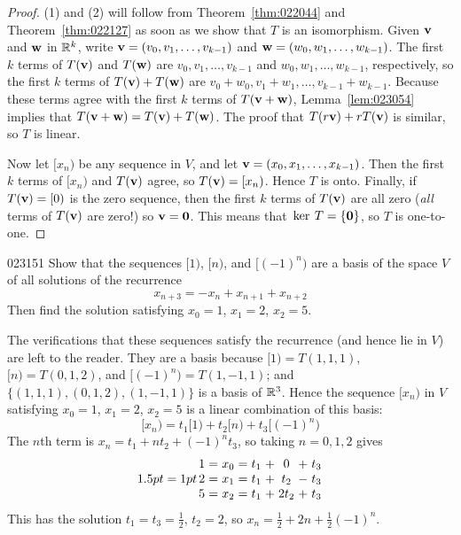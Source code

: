 \begin{proof}
(1) and (2) will follow from Theorem~\ref{thm:022044} and Theorem~\ref{thm:022127} as soon as we show that $T$ is an isomorphism. Given $\textbf{v}$ and $\textbf{w}$ in $\mathbb{R}^k$, write $\textbf{v} = (v_{0}, v_{1}, \dots, v_{k-1})$ and $\textbf{w} = (w_{0}, w_{1}, \dots, w_{k-1})$. The first $k$ terms of $T(\textbf{v})$ and $T(\textbf{w})$ are $v_{0}, v_{1}, \dots, v_{k-1}$ and $w_{0}, w_{1}, \dots, w_{k-1}$, respectively, so the first $k$ terms of $T(\textbf{v}) + T(\textbf{w})$ are $v_{0} + w_{0}, v_{1} + w_{1}, \dots, v_{k-1} + w_{k-1}$. Because these terms agree with the first $k$ terms of $T(\textbf{v} + \textbf{w})$, Lemma~\ref{lem:023054} implies that $T(\textbf{v} + \textbf{w}) = T(\textbf{v}) + T(\textbf{w})$. The proof that $T(r\textbf{v}) + rT(\textbf{v})$ is similar, so $T$ is linear.


Now let $[x_{n})$ be any sequence in $V$, and let $\textbf{v} = (x_{0}, x_{1}, \dots, x_{k-1})$. Then the first $k$ terms of $[x_{n})$ and $T(\textbf{v})$ agree, so $T(\textbf{v}) = [x_{n})$. Hence $T$ is onto. Finally, if $T(\textbf{v}) = [0)$ is the zero sequence, then the first $k$ terms of $T(\textbf{v})$ are all zero (\textit{all} terms of $T(\textbf{v})$ are zero!) so $\textbf{v} = \textbf{0}$. This means that $\thinspace\operatorname{ker \medspace}T = \{\textbf{0}\}$, so $T$ is one-to-one.
\end{proof}

\begin{example}{}{023151}
Show that the sequences $[1)$, $[n)$, and $[(-1)^{n})$ are a basis of the space $V$ of all solutions of the recurrence
\begin{equation*}
x_{n+3} = -x_{n} + x_{n+1} + x_{n+2}
\end{equation*}
Then find the solution satisfying $x_{0} = 1$, $x_{1} = 2$, $x_{2} = 5$.


\begin{solution}
  The verifications that these sequences satisfy the recurrence (and hence lie in $V$) are left to the reader. They are a basis because $[1) = T(1, 1, 1)$, $[n) = T(0, 1, 2)$, and $[(-1)^{n}) = T(1, -1, 1)$; and $\{(1, 1, 1), (0, 1, 2), (1, -1, 1)\}$ is a basis of $\mathbb{R}^3$. Hence the sequence $[x_{n})$ in $V$ satisfying $x_{0} = 1$, $x_{1} = 2$, $x_{2} = 5$ is a linear combination of this basis:
\begin{equation*}
[x_n) = t_1[1) + t_2[n) + t_3[(-1)^n)
\end{equation*}
The $n$th term is $x_{n} = t_{1} + nt_{2} + (-1)^{n}t_{3}$, so taking $n = 0, 1, 2$ gives
\begin{equation*}
\arraycolsep=1pt
\begin{array}{ccccccccc}
1 & = & x_0 & = & t_1 & + & 0 & + & t_3 \\
2 & = & x_1 & = &t_1 & + & t_2 & - & t_3 \\
5 & = & x_2 & = & t_1 & + & 2t_2 & + & t_3
\end{array}
\end{equation*}
This has the solution $t_1 = t_3 = \frac{1}{2}$, $t_2 = 2$, so $x_n = \frac{1}{2} + 2n + \frac{1}{2}(-1)^n$.
\end{solution}
\end{example}

